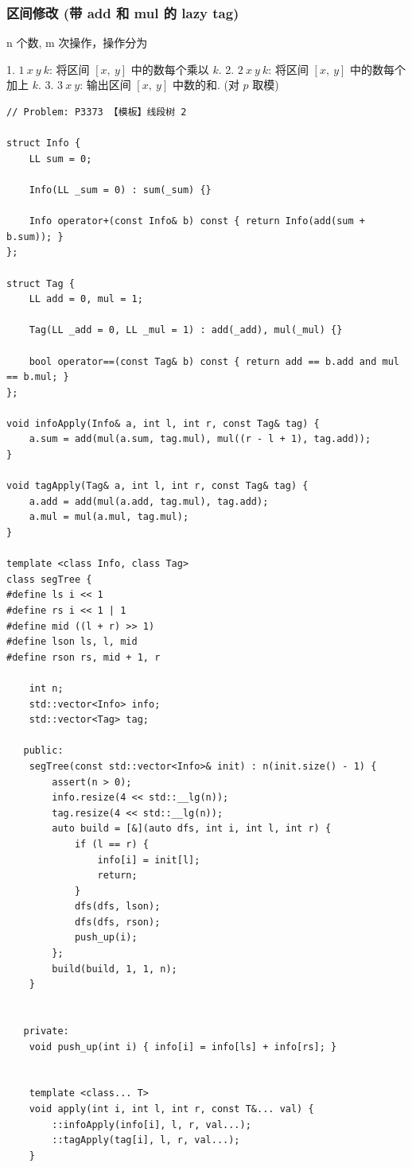 \documentclass[UTF8, a4paper, titlepage, twoside]{ctexart}
\begin{document}
\subsubsection*{ 区间修改 (带 add 和 mul 的 lazy tag) }

n 个数, m 次操作，操作分为

1. \(1 \ x \ y \ k\): 将区间 \([x, \ y]\) 中的数每个乘以 \(k\).
2. \(2 \ x \ y \ k\): 将区间 \([x, \ y]\) 中的数每个加上 \(k\).
3. \(3 \ x \ y\): 输出区间 \([x, \ y]\) 中数的和. (对 \(p\) 取模)

\begin{lstlisting}[style=cpp]
// Problem: P3373 【模板】线段树 2

struct Info {
    LL sum = 0;

    Info(LL _sum = 0) : sum(_sum) {}

    Info operator+(const Info& b) const { return Info(add(sum + b.sum)); }
};

struct Tag {
    LL add = 0, mul = 1;

    Tag(LL _add = 0, LL _mul = 1) : add(_add), mul(_mul) {}

    bool operator==(const Tag& b) const { return add == b.add and mul == b.mul; }
};

void infoApply(Info& a, int l, int r, const Tag& tag) {
    a.sum = add(mul(a.sum, tag.mul), mul((r - l + 1), tag.add));
}

void tagApply(Tag& a, int l, int r, const Tag& tag) {
    a.add = add(mul(a.add, tag.mul), tag.add);
    a.mul = mul(a.mul, tag.mul);
}

template <class Info, class Tag>
class segTree {
#define ls i << 1
#define rs i << 1 | 1
#define mid ((l + r) >> 1)
#define lson ls, l, mid
#define rson rs, mid + 1, r

    int n;
    std::vector<Info> info;
    std::vector<Tag> tag;

   public:
    segTree(const std::vector<Info>& init) : n(init.size() - 1) {
        assert(n > 0);
        info.resize(4 << std::__lg(n));
        tag.resize(4 << std::__lg(n));
        auto build = [&](auto dfs, int i, int l, int r) {
            if (l == r) {
                info[i] = init[l];
                return;
            }
            dfs(dfs, lson);
            dfs(dfs, rson);
            push_up(i);
        };
        build(build, 1, 1, n);
    }


   private:
    void push_up(int i) { info[i] = info[ls] + info[rs]; }


    template <class... T>
    void apply(int i, int l, int r, const T&... val) {
        ::infoApply(info[i], l, r, val...);
        ::tagApply(tag[i], l, r, val...);
    }


\end{lstlisting}
\end{document}
